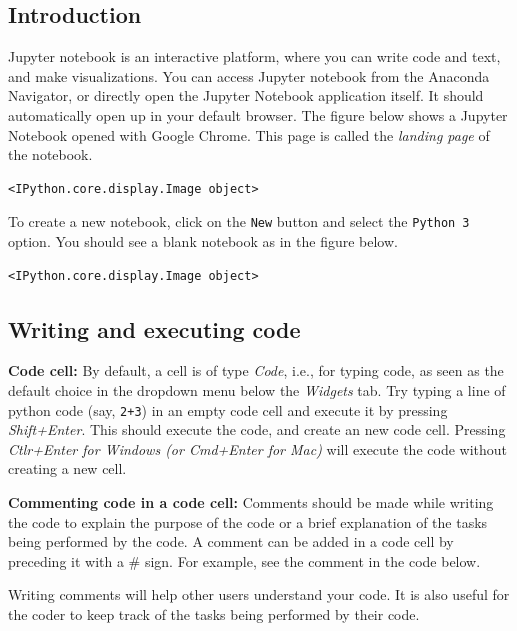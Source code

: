 \documentclass[
  letterpaper,
  DIV=11,
  numbers=noendperiod]{scrreprt}
\begin{document}
\hypertarget{introduction}{%
\subsection{Introduction}\label{introduction}}

Jupyter notebook is an interactive platform, where you can write code
and text, and make visualizations. You can access Jupyter notebook from
the Anaconda Navigator, or directly open the Jupyter Notebook
application itself. It should automatically open up in your default
browser. The figure below shows a Jupyter Notebook opened with Google
Chrome. This page is called the \emph{landing page} of the notebook.

\begin{verbatim}
<IPython.core.display.Image object>
\end{verbatim}

To create a new notebook, click on the \texttt{New} button and select
the \texttt{Python\ 3} option. You should see a blank notebook as in the
figure below.

\begin{verbatim}
<IPython.core.display.Image object>
\end{verbatim}

\hypertarget{writing-and-executing-code}{%
\subsection{Writing and executing
code}\label{writing-and-executing-code}}

\textbf{Code cell:} By default, a cell is of type \emph{Code}, i.e., for
typing code, as seen as the default choice in the dropdown menu below
the \emph{Widgets} tab. Try typing a line of python code (say,
\texttt{2+3}) in an empty code cell and execute it by pressing
\emph{Shift+Enter}. This should execute the code, and create an new code
cell. Pressing \emph{Ctlr+Enter for Windows (or Cmd+Enter for Mac)} will
execute the code without creating a new cell.

\textbf{Commenting code in a code cell:} Comments should be made while
writing the code to explain the purpose of the code or a brief
explanation of the tasks being performed by the code. A comment can be
added in a code cell by preceding it with a \# sign. For example, see
the comment in the code below.

Writing comments will help other users understand your code. It is also
useful for the coder to keep track of the tasks being performed by their
code.
\end{document}
